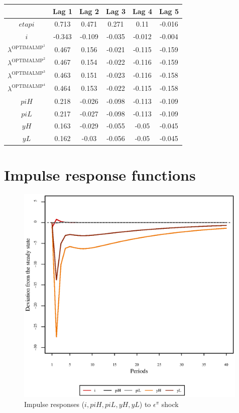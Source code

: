 \begin{tabular}{c|ccccc|}
  & Lag 1 & Lag 2 & Lag 3 & Lag 4 & Lag 5\\
\hline
${e\!t\!a\!p\!i}$ & 0.713 & 0.471 & 0.271 & 0.11 & -0.016 \\
$i$ & -0.343 & -0.109 & -0.035 & -0.012 & -0.004 \\
$\lambda^{\mathrm{OPTIMALMP}^{\mathrm{1}}}$ & 0.467 & 0.156 & -0.021 & -0.115 & -0.159 \\
$\lambda^{\mathrm{OPTIMALMP}^{\mathrm{2}}}$ & 0.467 & 0.154 & -0.022 & -0.116 & -0.159 \\
$\lambda^{\mathrm{OPTIMALMP}^{\mathrm{3}}}$ & 0.463 & 0.151 & -0.023 & -0.116 & -0.158 \\
$\lambda^{\mathrm{OPTIMALMP}^{\mathrm{4}}}$ & 0.464 & 0.153 & -0.022 & -0.115 & -0.158 \\
${p\!i\!H}$ & 0.218 & -0.026 & -0.098 & -0.113 & -0.109 \\
${p\!i\!L}$ & 0.217 & -0.027 & -0.098 & -0.113 & -0.109 \\
${y\!H}$ & 0.163 & -0.029 & -0.055 & -0.05 & -0.045 \\
${y\!L}$ & 0.162 & -0.03 & -0.056 & -0.05 & -0.045 \\
\hline
\end{tabular}



\pagebreak

\section{Impulse response functions}

\begin{figure}[h]
\centering
\begin{minipage}{0.5\textwidth}
\vspace*{-3em}
\centering
\includegraphics[width=0.99\textwidth, scale=0.55]{plots/plot_51.eps}
\caption{Impulse responses ($i, {p\!i\!H}, {p\!i\!L}, {y\!H}, {y\!L}$) to $\epsilon^{\pi}$ shock}
\end{minipage}
\end{figure}
